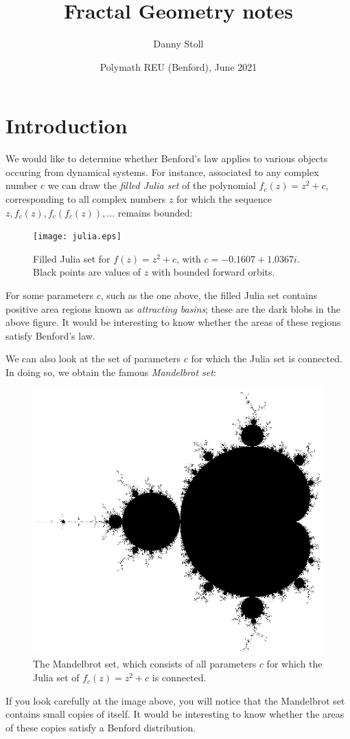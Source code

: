 \documentclass[twoside]{article}
\newcommand*{\1}{\mathbbm{1}}
\begin{document}
\title{Fractal Geometry notes}

\author{Danny Stoll}
\date{Polymath REU (Benford), June 2021}

\thispagestyle{firstpage}
\maketitle

\section{Introduction}
We would like to determine whether Benford's law applies to various objects occuring from dynamical systems. For instance, associated to any complex number \(c\) we can draw the \emph{filled Julia set} of the polynomial \(f_c(z) = z^2+c\), corresponding to all complex numbers \(z\) for which the sequence \(z, f_c(z), f_c(f_c(z)), \dots\) remains bounded:
\begin{figure}[H]
  \centering
  \texttt{[image: julia.eps]}
  \caption{Filled Julia set for \(f(z) = z^2 + c\), with \(c = -0.1607+1.0367i\). Black points are values of \(z\) with bounded forward orbits.}
\end{figure}
For some parameters \(c\), such as the one above, the filled Julia set contains positive area regions known as \emph{attracting basins}; these are the dark blobs in the above figure. It would be interesting to know whether the areas of these regions satisfy Benford's law.

We can also look at the set of parameters \(c\) for which the Julia set is connected. In doing so, we obtain the famous \emph{Mandelbrot set}:
\begin{figure}[H]
  \centering
  \includegraphics[scale=0.6]{mandelbrot.eps}
  \caption{The {Mandelbrot set}, which consists of all parameters \(c\) for which the Julia set of \(f_c(z) = z^2+c\) is connected.}
\end{figure}
If you look carefully at the image above, you will notice that the Mandelbrot set contains small copies of itself. It would be interesting to know whether the areas of these copies satisfy a Benford distribution.
\end{document}
